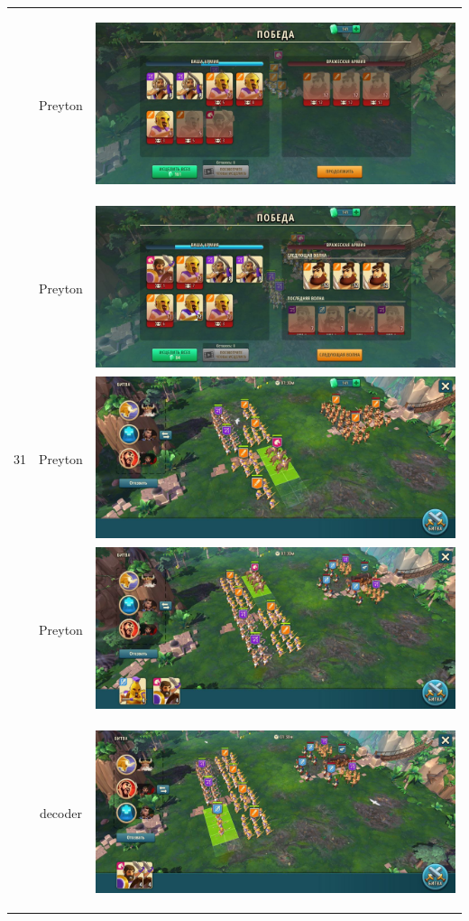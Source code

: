 \begin{longtable}{|c|c|c|}
	\hline
	\multirow{12}{*}{31} & Preyton &
	\hypertarget{fight31}{\includegraphics[width=0.75\linewidth]{./parts/media/TreasureHunt/31/Preyton/31_2.jpg}} \\
	& Preyton &
	\includegraphics[width=0.75\linewidth]{./parts/media/TreasureHunt/31/Preyton/31_1.jpg} \\
	& Preyton &
	\includegraphics[width=0.75\linewidth]{./parts/media/TreasureHunt/31/Preyton/31.2.jpg} \\
	& Preyton &
	\includegraphics[width=0.75\linewidth]{./parts/media/TreasureHunt/31/Preyton/31.1.jpg} \\
	\hline
	\multirow{12}{*}{31} & decoder &
	\hypertarget{fight31}{\includegraphics[width=0.75\linewidth]{./parts/media/TreasureHunt/31/decoder/photo_2022-04-07_09-59-48.jpg}} \\

\end{longtable}
